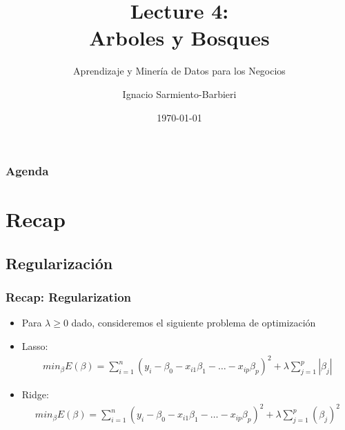 \documentclass[
  shownotes,
  xcolor={svgnames},
  hyperref={colorlinks,citecolor=DarkBlue,linkcolor=DarkRed,urlcolor=DarkBlue}
  , aspectratio=169]{beamer}
\begin{document}
\title[Lecture 4]{Lecture 4: \\ Arboles y Bosques}
\subtitle{Aprendizaje y Minería de Datos para los Negocios}
\date{\today}

\author[Sarmiento-Barbieri]{Ignacio Sarmiento-Barbieri}


\begin{frame}[noframenumbering]
\maketitle
\end{frame}





\begin{frame}
\frametitle{Agenda}

\tableofcontents

\end{frame}

\section{Recap}
\subsection{Regularización}
\begin{frame}[fragile]
\frametitle{Recap: Regularization}


\begin{itemize}
\item Para $\lambda \geq 0$ dado, consideremos el siguiente problema de optimización
\item Lasso:
\begin{align}
min_{\beta} E(\beta) = \sum_{i=1}^n (y_i-\beta_0 - x_{i1}\beta_1 - \dots - x_{ip}\beta_p)^2 + \lambda \sum_{j=1}^p |\beta_j| 
\end{align}
\item Ridge:
\begin{align}
min_{\beta} E(\beta) = \sum_{i=1}^n (y_i-\beta_0 - x_{i1}\beta_1 - \dots - x_{ip}\beta_p)^2 + \lambda \sum_{j=1}^p (\beta_j)^2
\end{align}
\end{itemize}

\end{frame}
\end{document}

